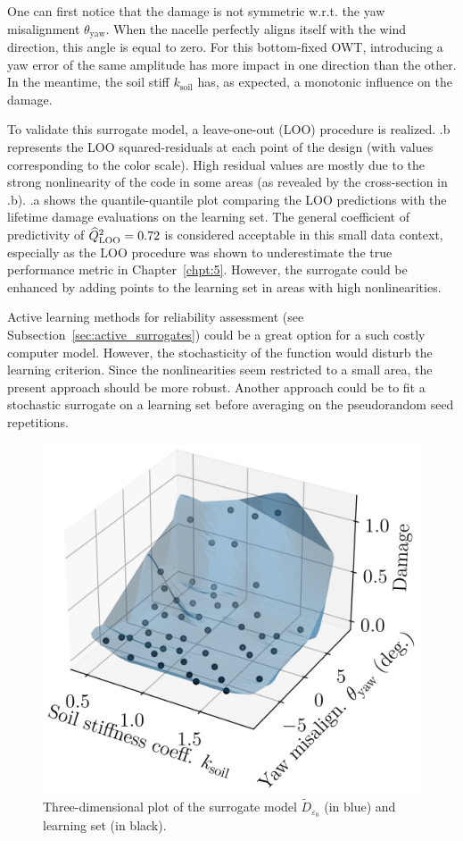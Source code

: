 One can first notice that the damage is not symmetric w.r.t. the yaw misalignment $\theta_{\mathrm{yaw}}$. 
When the nacelle perfectly aligns itself with the wind direction, this angle is equal to zero. 
For this bottom-fixed OWT, introducing a yaw error of the same amplitude has more impact in one direction than the other. 
In the meantime, the soil stiff $k_{\mathrm{soil}}$ has, as expected, a monotonic influence on the damage. 

To validate this surrogate model, a leave-one-out (LOO) procedure is realized. 
.b represents the LOO squared-residuals at each point of the design (with values corresponding to the color scale). 
High residual values are mostly due to the strong nonlinearity of the code in some areas (as revealed by the cross-section in .b).
.a shows the quantile-quantile plot comparing the LOO predictions with the lifetime damage evaluations on the learning set. 
The general coefficient of predictivity of $\widehat{Q}^2_{\mathrm{LOO}}=0.72$ is considered acceptable in this small data context, especially as the LOO procedure was shown to underestimate the true performance metric in Chapter~\ref{chpt:5}. 
However, the surrogate could be enhanced by adding points to the learning set in areas with high nonlinearities.

\medskip
\begin{remark}
    Active learning methods for reliability assessment (see Subsection~\ref{sec:active_surrogates}) could be a great option for a such costly computer model. 
    However, the stochasticity of the function would disturb the learning criterion. 
    Since the nonlinearities seem restricted to a small area, the present approach should be more robust. 
    Another approach could be to fit a stochastic surrogate \citep{binois_2019_replication,baker_2022_stochastic_surrogates_review,zhu_2023_thesis} on a learning set before averaging on the pseudorandom seed repetitions.  
\end{remark}
\medskip

\begin{figure}[h!]
    \centering
    \includegraphics[width=0.45\linewidth]{./part3/figures/OWT/3D_surrogate.png}
    \caption{Three-dimensional plot of the surrogate model $\widetilde{D}_{\varepsilon_0}$ (in blue) and learning set (in black).}
    \label{fig:3d_owt_surrogate}
\end{figure}

